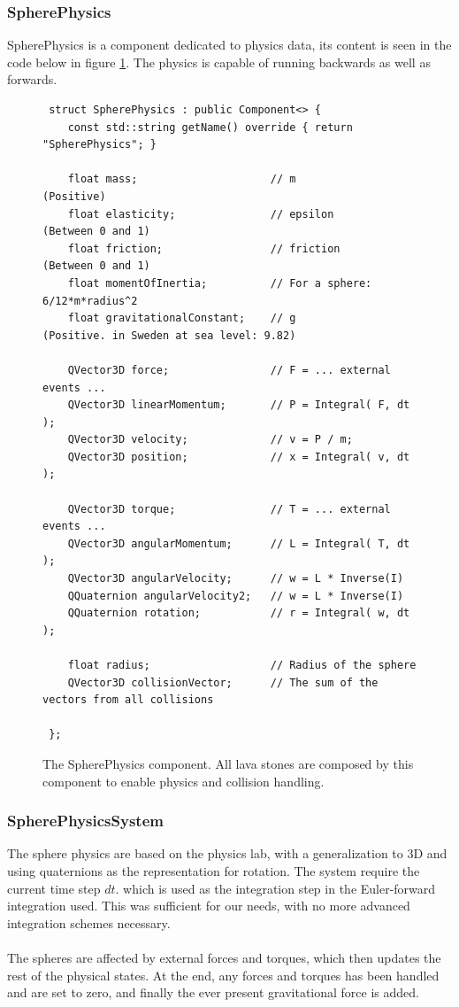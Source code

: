 \subsubsection{SpherePhysics}
SpherePhysics is a component dedicated to physics data, its content is seen in the code below in figure \ref{fig:spherePhysics}. The physics is capable of running backwards as well as forwards.
\begin{figure}[H]
\begin{lstlisting}
 struct SpherePhysics : public Component<> {
    const std::string getName() override { return "SpherePhysics"; }

    float mass;                     // m            (Positive)
    float elasticity;               // epsilon      (Between 0 and 1)
    float friction;                 // friction     (Between 0 and 1)
    float momentOfInertia;          // For a sphere: 6/12*m*radius^2
    float gravitationalConstant;    // g            (Positive. in Sweden at sea level: 9.82)

    QVector3D force;                // F = ... external events ...
    QVector3D linearMomentum;       // P = Integral( F, dt );
    QVector3D velocity;             // v = P / m;
    QVector3D position;             // x = Integral( v, dt );

    QVector3D torque;               // T = ... external events ...
    QVector3D angularMomentum;      // L = Integral( T, dt );
    QVector3D angularVelocity;      // w = L * Inverse(I)
    QQuaternion angularVelocity2;   // w = L * Inverse(I)
    QQuaternion rotation;           // r = Integral( w, dt );

    float radius;                   // Radius of the sphere
    QVector3D collisionVector;      // The sum of the vectors from all collisions

 };
\end{lstlisting}
\caption{The SpherePhysics component. All lava stones are composed by this component to enable physics and collision handling.}
\label{fig:spherePhysics}
\end{figure}

\subsubsection{SpherePhysicsSystem}
The sphere physics are based on the physics lab, with a generalization to 3D and using quaternions as the representation for rotation. The system require the current time step $dt$. which is used as the integration step in the Euler-forward integration used. This was sufficient for our needs, with no more advanced integration schemes necessary.\\
\\
The spheres are affected by external forces and torques, which then updates the rest of the physical states. At the end, any forces and torques has been handled and are set to zero, and finally the ever present gravitational force is added.

